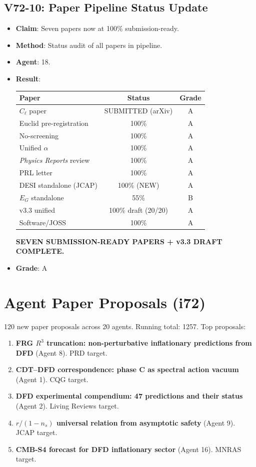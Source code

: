 \documentclass[11pt,a4paper]{article}
\begin{document}
\subsection{V72-10: Paper Pipeline Status Update}
\begin{itemize}[nosep]
\item \textbf{Claim}: Seven papers now at 100\% submission-ready.
\item \textbf{Method}: Status audit of all papers in pipeline.
\item \textbf{Agent}: 18.
\item \textbf{Result}:
\begin{center}
\begin{tabular}{lcc}
\toprule
\textbf{Paper} & \textbf{Status} & \textbf{Grade} \\
\midrule
$C_\ell$ paper & SUBMITTED (arXiv) & A \\
Euclid pre-registration & 100\% & A \\
No-screening & 100\% & A \\
Unified $\alpha$ & 100\% & A \\
\textit{Physics Reports} review & 100\% & A \\
PRL letter & 100\% & A \\
DESI standalone (JCAP) & 100\% (NEW) & A \\
$E_G$ standalone & 55\% & B \\
v3.3 unified & 100\% draft (20/20) & A \\
Software/JOSS & 100\% & A \\
\bottomrule
\end{tabular}
\end{center}
\textbf{SEVEN SUBMISSION-READY PAPERS + v3.3 DRAFT COMPLETE.}
\item \textbf{Grade}: A
\end{itemize}

\section{Agent Paper Proposals (i72)}

120 new paper proposals across 20 agents. Running total: 1257. Top proposals:

\begin{enumerate}[nosep]
\item \textbf{FRG $R^3$ truncation: non-perturbative inflationary predictions from DFD} (Agent 8). PRD target.
\item \textbf{CDT--DFD correspondence: phase C as spectral action vacuum} (Agent 1). CQG target.
\item \textbf{DFD experimental compendium: 47 predictions and their status} (Agent 2). Living Reviews target.
\item \textbf{$r/(1-n_s)$ universal relation from asymptotic safety} (Agent 9). JCAP target.
\item \textbf{CMB-S4 forecast for DFD inflationary sector} (Agent 16). MNRAS target.
\end{enumerate}
\end{document}
